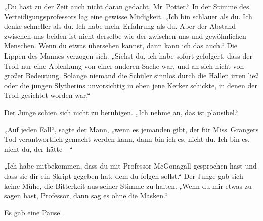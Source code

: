 „Du hast zu der Zeit auch nicht daran gedacht, Mr~Potter.“
In der Stimme des Verteidigungsprofessors lag eine gewisse Müdigkeit.
„Ich bin schlauer als du. Ich denke schneller als du. Ich habe mehr Erfahrung als du. Aber der Abstand zwischen uns beiden ist nicht derselbe wie der zwischen uns und gewöhnlichen Menschen. Wenn du etwas übersehen kannst, dann kann ich das auch.“ Die Lippen des Mannes verzogen sich. „Siehst du, ich habe sofort gefolgert, dass der Troll nur eine Ablenkung von einer anderen Sache war, und an sich nicht von großer Bedeutung. Solange niemand die Schüler sinnlos durch die Hallen irren ließ oder die jungen Slytherins unvorsichtig in eben jene Kerker schickte, in denen der Troll gesichtet worden war.“

Der Junge schien sich nicht zu beruhigen.
„Ich nehme an, das ist plausibel.“

„Auf jeden Fall“, sagte der Mann, „wenn es jemanden gibt, der für Miss~Grangers Tod verantwortlich gemacht werden kann, dann bin ich es, nicht du. Ich bin es, nicht du, der hätte—“

„Ich habe mitbekommen, dass du mit Professor McGonagall gesprochen hast und dass sie dir ein Skript gegeben hat, dem du folgen sollst.“
Der Junge gab sich keine Mühe, die Bitterkeit aus seiner Stimme zu halten.
„Wenn du mir etwas zu sagen hast, Professor, dann sag es ohne die Masken.“

Es gab eine Pause.

